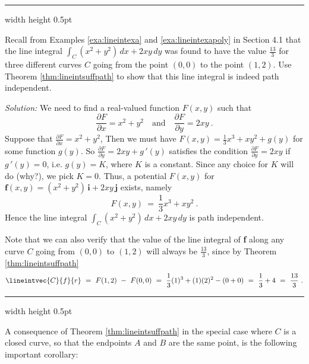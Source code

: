 \vspace{3mm}
\hrule width \textwidth height 0.5pt
\begin{exa}\label{exa:lineintexaclosed}
 Recall from Examples \ref{exa:lineintexa}  and \ref{exa:lineintexapoly} in Section 4.1 that the line
 integral $\int_C (x^2 + y^2 )\,dx + 2xy\,dy$ was found to have the value $\frac{13}{3}$ for three different curves $C$
 going from the point $(0,0)$ to the point $(1,2)$. Use Theorem \ref{thm:lineintsuffpath} to show that this line
 integral is indeed path independent.\vspace{1mm}
 \par\noindent \emph{Solution:} We need to find a real-valued function $F(x,y)$ such that
 \begin{displaymath}
  \frac{\partial F}{\partial x} = x^2 + y^2 \quad\text{and}\quad \frac{\partial F}{\partial y} =  2xy ~.
 \end{displaymath}
 Suppose that $\frac{\partial F}{\partial x} = x^2 + y^2$, Then we must have $F(x,y) = \frac{1}{3}x^3 + xy^2 + g(y)$ for
 some function $g(y)$. So $\frac{\partial F}{\partial y} = 2xy + g\,'(y)$
 satisfies the condition $\frac{\partial F}{\partial y} = 2xy$ if $g\,'(y)=0$, i.e. $g(y)=K$, where $K$ is a
 constant. Since any choice for $K$ will do (why?), we pick $K=0$. Thus, a potential $F(x,y)$ for 
 $\textbf{f}(x,y) = ( x^2 + y^2 )\,\textbf{i} + 2xy\,\textbf{j}$ exists, namely
 \begin{displaymath}
  F(x,y) ~=~ \frac{1}{3}x^3 + xy^2 ~.
 \end{displaymath}
 Hence the line integral $\int_C (x^2 + y^2 )\,dx + 2xy\,dy$ is path independent.
 
 \par\noindent Note that we can also verify that the value of the line integral of \textbf{f} along any curve $C$ going
 from $(0,0)$ to $(1,2)$ will always be $\frac{13}{3}$, since by Theorem \ref{thm:lineintsuffpath}
 \begin{displaymath}
  \lineintvec{C}{f}{r} ~=~ F(1,2) ~-~ F(0,0) ~=~ \frac{1}{3}(1)^3 + (1)(2)^2 - (0+0) ~=~ \frac{1}{3} + 4 ~=~ \frac{13}{3} ~.
 \end{displaymath}
\end{exa}
\hrule width \textwidth height 0.5pt
\vspace{3mm}

A consequence of Theorem \ref{thm:lineintsuffpath} in the special case where $C$ is a closed curve, so that the
endpoints $A$ and $B$ are the same point, is the following important corollary:

